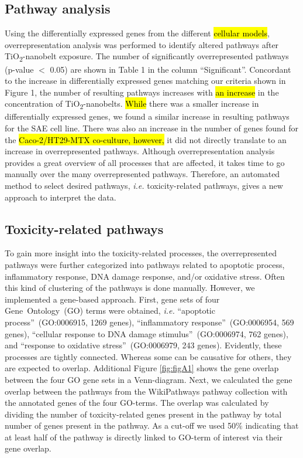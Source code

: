 \documentclass[ijms,article,submit,moreauthors,pdftex]{Definitions/mdpi}
\begin{document}
\subsection*{Pathway analysis}
Using the differentially expressed genes from the different \hl{cellular models}, overrepresentation analysis was performed to identify altered pathways after TiO\textsubscript{2}-nanobelt exposure. The number of significantly overrepresented pathways (p-value $<$ 0.05) are shown in Table 1 in the column “Significant”. Concordant to the increase in differentially expressed genes matching our criteria shown in Figure 1, the number of resulting pathways increases with \hl{an increase} in the concentration of TiO\textsubscript{2}-nanobelts. \hl{While} there was a smaller increase in differentially expressed genes, we found a similar increase in resulting pathways for the SAE cell line. There was also an increase in the number of genes found for the \hl{Caco-2/HT29-MTX co-culture, however,} it did not directly translate to an increase in overrepresented pathways. Although overrepresentation analysis provides a great overview of all processes that are affected, it takes time to go manually over the many overrepresented pathways. Therefore, an automated method to select desired pathways, \textit{i.e.} toxicity-related pathways, gives a new approach to interpret the data. 

\subsection*{Toxicity-related pathways}
To gain more insight into the toxicity-related processes, the overrepresented pathways were further categorized into pathways related to apoptotic process, inflammatory response, DNA damage response, and/or oxidative stress. Often this kind of clustering of the pathways is done manually. However, we implemented a gene-based approach. First, gene sets of four Gene~Ontology~(GO) terms were obtained, \textit{i.e.} “apoptotic process”~(GO:0006915, 1269 genes), “inflammatory response”~(GO:0006954, 569 genes),  “cellular response to DNA damage stimulus”~(GO:0006974, 762 genes), and “response to oxidative stress”~(GO:0006979, 243 genes). Evidently, these processes are tightly connected. Whereas some can be causative for others, they are expected to overlap. Additional Figure \ref{fig:figA1} shows the gene overlap between the four GO gene sets in a Venn-diagram. Next, we calculated the gene overlap between the pathways from the WikiPathways pathway collection with the annotated genes of the four GO-terms. The overlap was calculated by dividing the number of toxicity-related genes present in the pathway by total number of genes present in the pathway. As a cut-off we used 50$\%$ indicating that at least half of the pathway is directly linked to GO-term of interest via their gene overlap.
\end{document}
